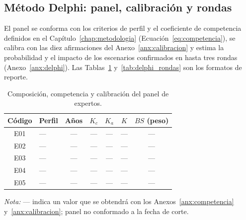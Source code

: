 \subsection{Método Delphi: panel, calibración y rondas}

El panel se conforma con los criterios de perfil y el coeficiente de competencia definidos en el Capítulo~\ref{chap:metodologia} (Ecuación~\ref{eq:competencia}), se calibra con las diez afirmaciones del Anexo~\ref{anx:calibracion} y estima la probabilidad y el impacto de los escenarios confirmados en hasta tres rondas (Anexo~\ref{anx:delphi}). Las Tablas~\ref{tab:panel_resultados} y~\ref{tab:delphi_rondas} son los formatos de reporte.

\begin{table}[htbp]
  \centering
  \caption{Composición, competencia y calibración del panel de expertos.}
  \label{tab:panel_resultados}
  \footnotesize
  \renewcommand{\arraystretch}{1.2}
  \begin{tabular}{|c|l|c|c|c|c|c|}
    \hline
    \textbf{Código} & \textbf{Perfil} & \textbf{Años} & \textbf{$K_c$} & \textbf{$K_a$} & \textbf{$K$} & \textbf{$BS$ (peso)} \\
    \hline
    E01 & --- & --- & --- & --- & --- & --- \\ \hline
    E02 & --- & --- & --- & --- & --- & --- \\ \hline
    E03 & --- & --- & --- & --- & --- & --- \\ \hline
    E04 & --- & --- & --- & --- & --- & --- \\ \hline
    E05 & --- & --- & --- & --- & --- & --- \\ \hline
  \end{tabular}
  \par\vspace{2pt}
  \raggedright
  \textit{Nota:} --- indica un valor que se obtendrá con los Anexos~\ref{anx:competencia} y~\ref{anx:calibracion}; panel no conformado a la fecha de corte.
\end{table}

